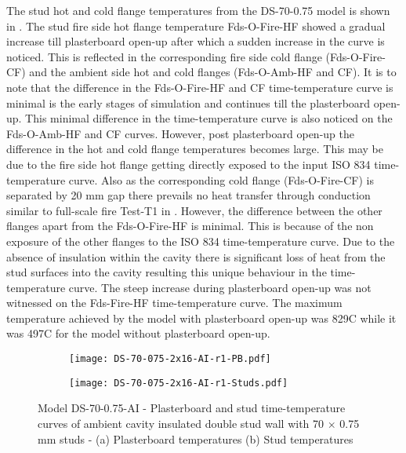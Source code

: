 The stud hot and cold flange temperatures from the DS-70-0.75 model is shown in . The stud fire side hot flange temperature Fds-O-Fire-HF showed a gradual increase till plasterboard open-up after which a sudden increase in the curve is noticed. This is reflected in the corresponding fire side cold flange (Fds-O-Fire-CF) and the ambient side hot and cold flanges (Fds-O-Amb-HF and CF). It is to note that the difference in the Fds-O-Fire-HF and CF time-temperature curve is minimal is the early stages of simulation and continues till the plasterboard open-up. This minimal difference in the time-temperature curve is also noticed on the Fds-O-Amb-HF and CF curves. However, post plasterboard open-up the difference in the hot and cold flange temperatures becomes large. This may be due to the fire side hot flange getting directly exposed to the input ISO 834 time-temperature curve. Also as the corresponding cold flange (Fds-O-Fire-CF) is separated by 20 mm gap there prevails no heat transfer through conduction similar to full-scale fire Test-T1 in . However, the difference between the other flanges apart from the Fds-O-Fire-HF is minimal. This is because of the non exposure of the other flanges to the ISO 834 time-temperature curve. Due to the absence of insulation within the cavity there is significant loss of heat from the stud surfaces into the cavity resulting this unique behaviour in the time-temperature curve. The steep increase during plasterboard open-up was not witnessed on the Fds-Fire-HF time-temperature curve. The maximum temperature achieved by the model with plasterboard open-up was 829\degree C while it was 497\degree C for the model without plasterboard open-up. 
\begin{figure}[!htbp]
	\centering
	\begin{subfigure}[b]{0.6\textwidth}
		\centering
		\texttt{[image: DS-70-075-2x16-AI-r1-PB.pdf]}
		\caption{}
		\label{subfig:DS-70-075-2x16-AI-r1-PB}
	\end{subfigure}
	\begin{subfigure}[b]{0.6\textwidth}
		\centering
		\texttt{[image: DS-70-075-2x16-AI-r1-Studs.pdf]}
		\caption{}
		\label{subfig:DS-70-075-2x16-AI-r1-Studs}
	\end{subfigure}
	   \caption{Model DS-70-0.75-AI - Plasterboard and stud time-temperature curves of ambient cavity insulated double stud wall with 70 $\times$ 0.75 mm studs - (a) Plasterboard temperatures (b) Stud temperatures}
	   \label{fig:DS-70-075-2x16-AI-r1}
\end{figure} 

